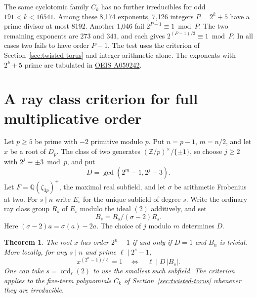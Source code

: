 \documentclass[11pt]{article}
\newtheorem{theorem}{Theorem}
\newcommand{\ord}{\operatorname{ord}}
\begin{document}
The same cyclotomic family \(C_k\) has no further irreducibles for
odd \(191<k<16541\). Among these 8,174 exponents, 7,126 integers
\(P=2^k+5\) have a prime divisor at most 8192. Another 1,046 fail
\(2^{P-1}\equiv1\bmod P\). The two remaining exponents are \(273\)
and \(341\), and each gives \(2^{(P-1)/3}\equiv1\bmod P\).
In all cases two fails to have order \(P-1\). The test uses the
criterion of Section~\ref{sec:twisted-torus} and integer arithmetic
alone. The exponents with \(2^k+5\) prime are tabulated in
\href{https://oeis.org/A059242}{OEIS A059242}.

\clearpage
\section{A ray class criterion for full multiplicative order}
\label{sec:twisted-full-ray}

Let \(p\ge5\) be prime with \(-2\) primitive modulo \(p\).
Put \(n=p-1\), \(m=n/2\), and let \(x\) be a root of \(D_p\).
The class of two generates \((\mathbb Z/p)^\times/\{\pm1\}\),
so choose \(j\ge2\) with \(2^j\equiv\pm3\bmod p\), and put
\[
                   D=\gcd(2^m-1,2^j-3).
\]
Let \(F=\mathbb Q(\zeta_{3p})^+\), the maximal real subfield,
and let \(\sigma\) be arithmetic Frobenius at two. For \(s\mid n\)
write \(E_s\) for the unique subfield of degree \(s\). Write the
ordinary ray class group \(R_s\) of \(E_s\) modulo the ideal \((2)\)
additively, and set
\[
                      B_s=R_s/(\sigma-2)R_s .
\]
Here \((\sigma-2)a=\sigma(a)-2a\). The choice of \(j\) modulo
\(m\) determines \(D\).

\begin{theorem}\label{thm:twisted-full-ray}
The root \(x\) has order \(2^n-1\) if and only if \(D=1\) and
\(B_n\) is trivial. More locally, for any \(s\mid n\) and prime
\(\ell\mid2^s-1\),
\[
       x^{(2^n-1)/\ell}=1
          \quad\Longleftrightarrow\quad \ell\mid D\,|B_s|.
\]
One can take \(s=\ord_\ell(2)\) to use the smallest such subfield.
The criterion applies to the five-term polynomials \(C_k\) of
Section~\ref{sec:twisted-torus} whenever they are irreducible.
\end{theorem}
\end{document}
